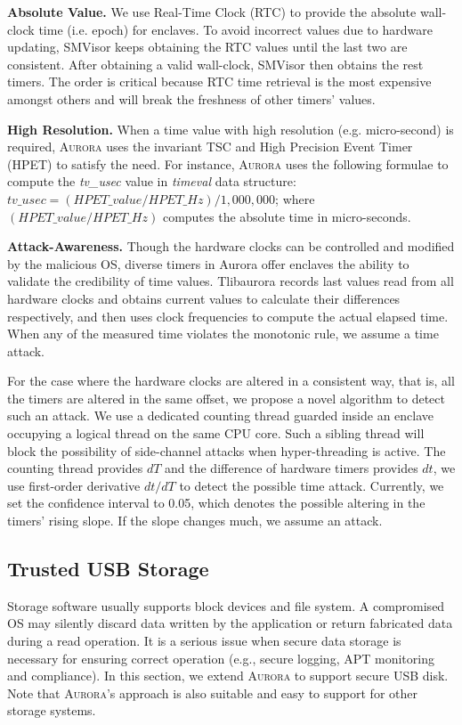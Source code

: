 \textbf{Absolute Value.}
We use Real-Time Clock (RTC) to provide the absolute wall-clock time (i.e. epoch) for enclaves. To avoid incorrect values due to hardware updating, SMVisor keeps obtaining the RTC values until the last two are consistent. After obtaining a valid wall-clock, SMVisor then obtains the rest timers. The order is critical because RTC time retrieval is the most expensive amongst others and will break the freshness of other timers' values.

\textbf{High Resolution.}
When a time value with high resolution (e.g. micro-second) is required, \textsc{Aurora} uses the invariant TSC and High Precision Event Timer (HPET) to satisfy the need. For instance, \textsc{Aurora} uses the following formulae to compute the \textit{tv\_usec} value in \textit{timeval} data structure: {$tv\_usec = (HPET\_value/ HPET\_Hz) / 1,000,000$;} where $(HPET\_value / HPET\_Hz)$ computes the absolute time in micro-seconds.

\textbf{Attack-Awareness.}
Though the hardware clocks can be controlled and modified by the malicious OS, diverse timers in Aurora offer enclaves the ability to validate the credibility of time values. Tlibaurora records last values read from all hardware clocks and obtains current values to calculate their differences respectively, and then uses clock frequencies to compute the actual elapsed time. When any of the measured time violates the monotonic rule, we assume a time attack.

For the case where the hardware clocks are altered in a consistent way, that is, all the timers are altered in the same offset, we propose a novel algorithm to detect such an attack. We use a dedicated counting thread \cite{DBLP:conf/dimva/SchwarzWGMM17} guarded inside an enclave occupying a logical thread on the same CPU core. Such a sibling thread will block the possibility of side-channel attacks when hyper-threading is active. The counting thread provides $dT$ and the difference of hardware timers provides $dt$, we use first-order derivative $dt/dT$ to detect the possible time attack. Currently, we set the confidence interval to 0.05, which denotes the possible altering in the timers' rising slope. If the slope changes much, we assume an attack.

\subsection{Trusted USB Storage}\label{storage_service}
Storage software usually supports block devices and file system. A compromised OS may silently discard data written by the application or return fabricated data during a read operation. It is a serious issue when secure data storage is  necessary for ensuring correct operation (e.g., secure logging, APT monitoring and compliance). In this section, we extend \textsc{Aurora} to support secure USB disk. Note that \textsc{Aurora}'s approach is also suitable and easy to support for other storage systems.

